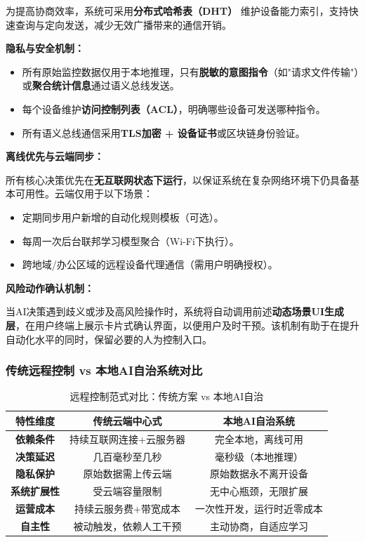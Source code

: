 \documentclass[12pt,a4paper]{article}
\begin{document}
为提高协商效率，系统可采用\textbf{分布式哈希表（DHT）} 维护设备能力索引，支持快速查询与定向发送，减少无效广播带来的通信开销。

\textbf{隐私与安全机制：}

\begin{itemize}[noitemsep]
  \item 所有原始监控数据仅用于本地推理，只有\textbf{脱敏的意图指令}（如"请求文件传输"）或\textbf{聚合统计信息}通过语义总线发送。
  \item 每个设备维护\textbf{访问控制列表（ACL）}，明确哪些设备可发送哪种指令。
  \item 所有语义总线通信采用\textbf{TLS加密 + 设备证书}或区块链身份验证。
\end{itemize}

\textbf{离线优先与云端同步：}

所有核心决策优先在\textbf{无互联网状态下运行}，以保证系统在复杂网络环境下仍具备基本可用性。云端仅用于以下场景：

\begin{itemize}[noitemsep]
  \item 定期同步用户新增的自动化规则模板（可选）。
  \item 每周一次后台联邦学习模型聚合（Wi-Fi下执行）。
  \item 跨地域/办公区域的远程设备代理通信（需用户明确授权）。
\end{itemize}

\textbf{风险动作确认机制：}

当AI决策遇到歧义或涉及高风险操作时，系统将自动调用前述\textbf{动态场景UI生成层}，在用户终端上展示卡片式确认界面，以便用户及时干预。该机制有助于在提升自动化水平的同时，保留必要的人为控制入口。

\subsubsection{传统远程控制 vs 本地AI自治系统对比}

\begin{table}[H]
\centering
\small
\begin{tabular}{|c|c|c|}
\hline
\textbf{特性维度} & \textbf{传统云端中心式} & \textbf{本地AI自治系统} \\
\hline
\textbf{依赖条件} & 持续互联网连接+云服务器 & 完全本地，离线可用 \\
\hline
\textbf{决策延迟} & 几百毫秒至几秒 & 毫秒级（本地推理） \\
\hline
\textbf{隐私保护} & 原始数据需上传云端 & 原始数据永不离开设备 \\
\hline
\textbf{系统扩展性} & 受云端容量限制 & 无中心瓶颈，无限扩展 \\
\hline
\textbf{运营成本} & 持续云服务费+带宽成本 & 一次性开发，运行时近零成本 \\
\hline
\textbf{自主性} & 被动触发，依赖人工干预 & 主动协商，自适应学习 \\
\hline
\end{tabular}
\caption{远程控制范式对比：传统方案 vs 本地AI自治}
\end{table}
\end{document}
